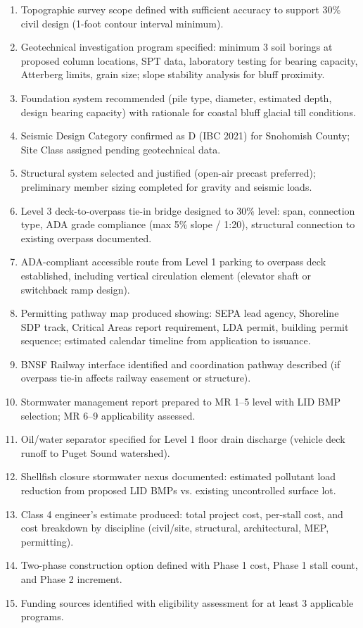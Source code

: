 \documentclass[11pt,letterpaper]{article}
\begin{document}
\begin{enumerate}
  \item Topographic survey scope defined with sufficient accuracy to support 30\% civil design (1-foot contour interval minimum).
  \item Geotechnical investigation program specified: minimum 3 soil borings at proposed column locations, SPT data, laboratory testing for bearing capacity, Atterberg limits, grain size; slope stability analysis for bluff proximity.
  \item Foundation system recommended (pile type, diameter, estimated depth, design bearing capacity) with rationale for coastal bluff glacial till conditions.
  \item Seismic Design Category confirmed as D (IBC 2021) for Snohomish County; Site Class assigned pending geotechnical data.
  \item Structural system selected and justified (open-air precast preferred); preliminary member sizing completed for gravity and seismic loads.
  \item Level 3 deck-to-overpass tie-in bridge designed to 30\% level: span, connection type, ADA grade compliance (max 5\% slope / 1:20), structural connection to existing overpass documented.
  \item ADA-compliant accessible route from Level 1 parking to overpass deck established, including vertical circulation element (elevator shaft or switchback ramp design).
  \item Permitting pathway map produced showing: SEPA lead agency, Shoreline SDP track, Critical Areas report requirement, LDA permit, building permit sequence; estimated calendar timeline from application to issuance.
  \item BNSF Railway interface identified and coordination pathway described (if overpass tie-in affects railway easement or structure).
  \item Stormwater management report prepared to MR 1--5 level with LID BMP selection; MR 6--9 applicability assessed.
  \item Oil/water separator specified for Level 1 floor drain discharge (vehicle deck runoff to Puget Sound watershed).
  \item Shellfish closure stormwater nexus documented: estimated pollutant load reduction from proposed LID BMPs vs. existing uncontrolled surface lot.
  \item Class 4 engineer's estimate produced: total project cost, per-stall cost, and cost breakdown by discipline (civil/site, structural, architectural, MEP, permitting).
  \item Two-phase construction option defined with Phase 1 cost, Phase 1 stall count, and Phase 2 increment.
  \item Funding sources identified with eligibility assessment for at least 3 applicable programs.
\end{enumerate}
\end{document}

